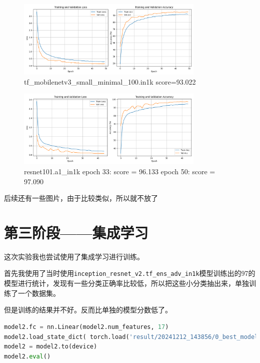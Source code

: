 \documentclass[12pt,a4paper,UTF8]{article}
\begin{document}
\begin{figure}[htbp] \centering \includegraphics[width=0.8\textwidth]{figures/2024-12-12-19-30-02.png} \caption{tf\_mobilenetv3\_small\_minimal\_100.in1k score=93.022} \end{figure}


\begin{figure}[htbp] \centering \includegraphics[width=0.8\textwidth]{figures/2024-12-12-19-30-41.png} \caption{resnet101.a1\_in1k epoch 33: score = 96.133 epoch 50: score = 97.090} \end{figure}


后续还有一些图片，由于比较类似，所以就不放了

\clearpage
\section{第三阶段——集成学习}

这次实验我也尝试使用了集成学习进行训练。

首先我使用了当时使用\texttt{inception\_resnet\_v2.tf\_ens\_adv\_in1k}模型训练出的97的模型进行统计，发现有一些分类正确率比较低，所以把这些小分类抽出来，单独训练了一个数据集。

但是训练的结果并不好。反而比单独的模型分数低了。

\begin{lstlisting}[language=Python, caption=使用前后两个模型进行训练]
model2.fc = nn.Linear(model2.num_features, 17)
model2.load_state_dict( torch.load('result/20241212_143856/0_best_model.pth', map_location=device)['state_dict'])
model2 = model2.to(device)
model2.eval()
\end{lstlisting}
\end{document}
